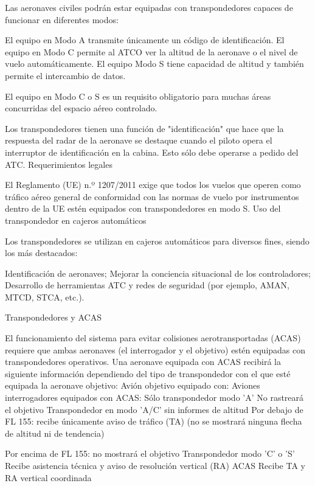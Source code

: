 Las aeronaves civiles podrán estar equipadas con transpondedores capaces de funcionar en diferentes modos:

    El equipo en Modo A transmite únicamente un código de identificación.
    El equipo en Modo C  permite al ATCO ver la altitud de la aeronave o el nivel de vuelo automáticamente.
    El equipo Modo S  tiene capacidad de altitud y también permite el intercambio de datos.

El equipo en Modo C o S es un requisito obligatorio para muchas áreas concurridas del espacio aéreo controlado.

Los transpondedores tienen una función de "identificación" que hace que la respuesta del radar de la aeronave se destaque cuando el piloto opera el interruptor de identificación en la cabina. Esto sólo debe operarse a pedido del ATC.
Requerimientos legales

El Reglamento (UE) n.º 1207/2011 exige que todos los vuelos que operen como tráfico aéreo general de conformidad con las normas de vuelo por instrumentos dentro de la UE estén equipados con transpondedores en modo S.
Uso del transpondedor en cajeros automáticos

Los transpondedores se utilizan en cajeros automáticos para diversos fines, siendo los más destacados:

    Identificación de aeronaves;
    Mejorar la conciencia situacional de los controladores;
    Desarrollo de herramientas ATC y redes de seguridad (por ejemplo, AMAN, MTCD, STCA, etc.).

Transpondedores y ACAS

El funcionamiento del sistema para evitar colisiones aerotransportadas (ACAS)  requiere que ambas aeronaves (el interrogador y el objetivo) estén equipadas con transpondedores operativos. Una aeronave equipada con ACAS recibirá la siguiente información dependiendo del tipo de transpondedor con el que esté equipada la aeronave objetivo:
Avión objetivo equipado con: 	Aviones interrogadores equipados con ACAS:
Sólo transpondedor modo 'A' 	No rastreará el objetivo
Transpondedor en modo 'A/C' sin informes de altitud 	Por debajo de FL 155: recibe únicamente aviso de tráfico (TA) (no se mostrará ninguna flecha de altitud ni de tendencia)

Por encima de FL 155: no mostrará el objetivo
Transpondedor modo 'C' o 'S' 	Recibe asistencia técnica y aviso de resolución vertical (RA)
ACAS 	Recibe TA y RA vertical coordinada